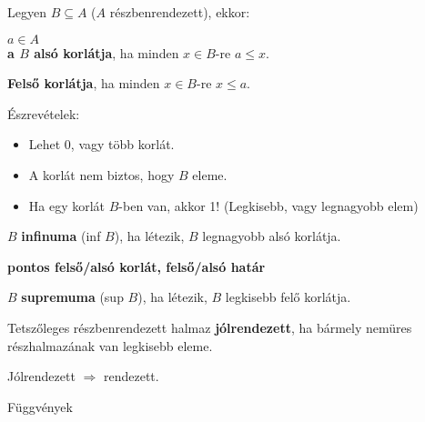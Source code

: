 \begin{frame}
\begin{tcolorbox}[title={Def.: Alsó korlát, Felső korlát}]
Legyen $B \subseteq A$ ($A$ részbenrendezett), ekkor:\\
\msmallskip

$a \in A$\\
\textbf{a $B$ alsó korlátja}, ha minden $x \in B$-re $a \leq x$.\\
\mmedskip

\textbf{Felső korlátja}, ha minden $x \in B$-re $x \leq a$.\\
\mmedskip

Észrevételek:\\
\begin{itemize}
\item Lehet 0, vagy több korlát.
\item A korlát nem biztos, hogy $B$ eleme.
\item Ha egy korlát $B$-ben van, akkor 1! (Legkisebb, vagy legnagyobb elem)
\end{itemize}
\end{tcolorbox}

\begin{tcolorbox}[title={Def.: Infinum, Supremum}]
$B$ \textbf{infinuma} (inf $B$), ha létezik, $B$ legnagyobb alsó korlátja.\\
\mmedskip

\textbf{pontos felső/alsó korlát, felső/alsó határ}\\
\mmedskip

$B$ \textbf{supremuma} (sup $B$), ha létezik, $B$ legkisebb felő korlátja.
\end{tcolorbox}

\begin{tcolorbox}[title={Def.: Jólrendezett halmaz}]
Tetszőleges részbenrendezett halmaz \textbf{jólrendezett}, ha bármely nemüres részhalmazának van legkisebb eleme.
\end{tcolorbox}

\begin{tcolorbox}[title={Ész}]
Jólrendezett $\Rightarrow$ rendezett.
\end{tcolorbox}
\end{frame}


\begin{frame}[plain]
\begin{tcolorbox}[center, colback={myyellow}, coltext={black}, colframe={myyellow}]
    {\Huge Függvények}
    \mmedskip
\end{tcolorbox}
\end{frame}


